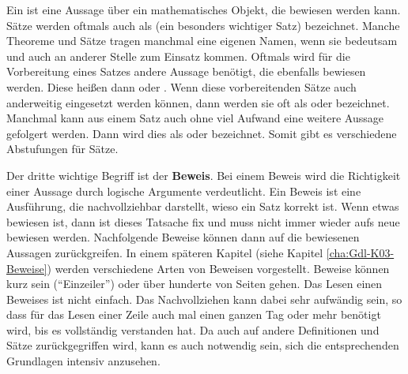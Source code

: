\begin{Unit}
Ein  ist eine Aussage über ein mathematisches Objekt, die 
bewiesen werden kann. Sätze werden oftmals auch als  (ein 
besonders wichtiger Satz) bezeichnet. Manche Theoreme und Sätze tragen manchmal 
eine eigenen Namen, wenn sie bedeutsam und auch an anderer Stelle zum Einsatz
kommen. Oftmals wird für die Vorbereitung eines Satzes andere Aussage benötigt, 
die ebenfalls bewiesen werden. Diese heißen dann  oder
. Wenn diese vorbereitenden Sätze auch anderweitig eingesetzt
werden können, dann werden sie oft als  oder 
bezeichnet. Manchmal kann aus einem Satz auch ohne viel Aufwand eine weitere 
Aussage gefolgert werden. Dann wird dies als  oder
 bezeichnet. Somit gibt es verschiedene Abstufungen für Sätze.
\end{Unit}

\begin{Unit}
Der dritte wichtige Begriff ist der \textbf{Beweis}. Bei einem Beweis wird die
Richtigkeit einer Aussage durch logische Argumente verdeutlicht. Ein Beweis 
ist eine Ausführung, die nachvollziehbar darstellt, wieso ein Satz korrekt 
ist. Wenn etwas bewiesen ist, dann ist dieses Tatsache fix und muss nicht 
immer wieder aufs neue bewiesen werden. Nachfolgende Beweise können dann auf 
die bewiesenen Aussagen zurückgreifen. In einem späteren Kapitel (siehe 
Kapitel \ref{cha:Gdl-K03-Beweise}) werden verschiedene Arten von Beweisen
vorgestellt. Beweise können kurz sein (\enquote{Einzeiler}) oder über hunderte 
von Seiten gehen. Das Lesen einen Beweises ist nicht einfach. Das 
Nachvollziehen kann dabei sehr aufwändig sein, so dass für das Lesen einer 
Zeile auch mal einen ganzen Tag oder mehr benötigt wird, bis es 
vollständig verstanden hat. Da auch auf andere Definitionen und Sätze
zurückgegriffen wird, kann es auch notwendig sein, sich die entsprechenden
Grundlagen intensiv anzusehen.
\end{Unit}

